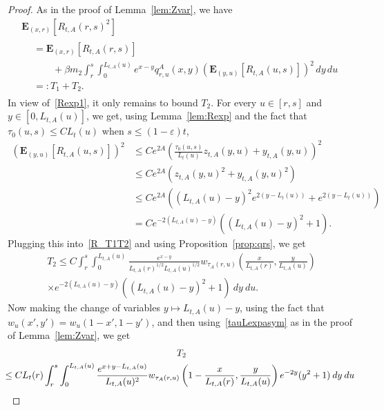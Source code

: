 \documentclass[AHL,Unicode,longabstracts,published]{cedram}
\newcommand*\eps{\varepsilon}
\newcommand*\E{\mathbf{E}}
\newcommand{\1} {\mathds{1}}
\begin{document}
\begin{proof}
As in the proof of Lemma~\ref{lem:Zvar}, we have
\begin{multline}\label{R_T1T2}
\E_{(x,r)}\left[R_{t,A}(r,s)^2\right]\\
\begin{aligned}
&= \E_{(x,r)}\left[R_{t,A}(r,s)\right] \\
&\qquad + \beta m_2 \int_r^s \int_0^{L_{t,A}(u)} e^{x-y}q^A_{r,u}(x,y)\left(\E_{(y,u)}\left[R_{t,A}(u,s)\right]\right)^2\,dy\,du\\
&=: T_1 + T_2.
\end{aligned}
\end{multline}
In view of~\eqref{Rexp1}, it only remains to bound $T_2$. For every $u\in[r,s]$ and $y\in [0,L_{t,A}(u)]$, we get, using Lemma~\ref{lem:Rexp} and the fact that $\tau_0(u,s) \leq C L_t(u)$ when $s \leq (1 - \eps)t$,
\begin{align*}
\left(\E_{(y,u)}\left[R_{t,A}(u,s)\right]\right)^2 &\leq C e^{2A}\left(\frac{\tau_0(u,s)}{L_t(u)} z_{t,A}(y,u)+y_{t,A}(y,u)\right)^2 \\
&\leq C e^{2A} \left(z_{t,A}(y,u)^2+y_{t,A}(y,u)^2 \right) \\
&\leq C e^{2A} \left(\left(L_{t,A}(u) - y\right)^2 e^{2\left(y - L_t(u)\right)} + e^{2\left(y - L_t(u)\right)} \right) \\
&= C e^{-2\left(L_{t,A}(u) - y\right)} \left(\left(L_{t,A}(u) - y\right)^2 + 1 \right).
\end{align*}
Plugging this into~\eqref{R_T1T2} and using Proposition~\ref{prop:qrs}, we get
\begin{multline*}
T_2 \leq C \int_r^s \int_0^{L_{t,A}(u)} \frac{e^{x-y}}{L_{t,A}(r)^{1/2} L_{t,A}(u)^{1/2}} w_{\tau_A(r,u)}\left(\frac{x}{L_{t,A}(r)}, \frac{y}{L_{t,A}(u)} \right) \\
\times e^{-2\left(L_{t,A}(u) - y\right)} \left(\left(L_{t,A}(u) - y\right)^2 + 1 \right) \: dy \: du.
\end{multline*}
Now making the change of variables $y \mapsto L_{t,A}(u) - y$, using the fact that $w_u(x',y') = w_u(1 - x', 1 - y')$, and then using~\eqref{tauLexpasym} as in the proof of Lemma~\ref{lem:Zvar}, we get
\begin{multline*}
T_2\\
\mkern-15mu\begin{aligned}
&\leq C L_t(r) \int_r^s \int_0^{L_{t,A}(u)} \frac{e^{x + y - L_{t,A}(u)}}{L_{t,A}(u)^2} w_{\tau_A(r,u)}\left(1 - \frac{x}{L_{t,A}(r)}, \frac{y}{L_{t,A}(u)} \right) e^{-2y}(y^2 + 1) \: dy \: du \\

\end{aligned}
\end{multline*}
\end{proof}
\end{document}
